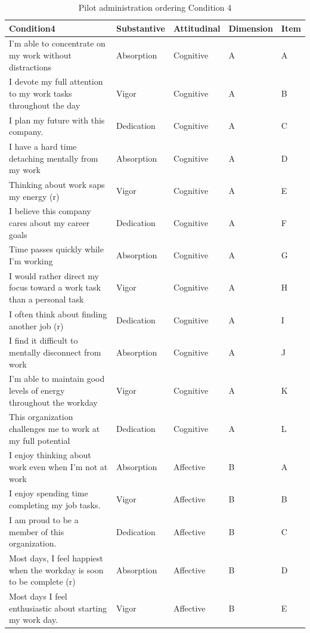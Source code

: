 \documentclass[
]{book}
\begin{document}
\begin{table}

\caption{\label{tab:conditions}Pilot administration ordering Condition 4}
\centering
\begin{tabular}[t]{l|l|l|l|l}
\hline
Condition4 & Substantive & Attitudinal & Dimension & Item\\
\hline
I’m able to concentrate on my work without distractions & Absorption & Cognitive & A & A\\
\hline
I devote my full attention to my work tasks throughout the day & Vigor & Cognitive & A & B\\
\hline
I plan my future with this company. & Dedication & Cognitive & A & C\\
\hline
I have a hard time detaching mentally from my work & Absorption & Cognitive & A & D\\
\hline
Thinking about work saps my energy (r) & Vigor & Cognitive & A & E\\
\hline
I believe this company cares about my career goals & Dedication & Cognitive & A & F\\
\hline
Time passes quickly while I’m working & Absorption & Cognitive & A & G\\
\hline
I would rather direct my focus toward a work task than a personal task & Vigor & Cognitive & A & H\\
\hline
I often think about finding another job (r) & Dedication & Cognitive & A & I\\
\hline
I find it difficult to mentally disconnect from work & Absorption & Cognitive & A & J\\
\hline
I’m able to maintain good levels of energy throughout the workday & Vigor & Cognitive & A & K\\
\hline
This organization challenges me to work at my full potential & Dedication & Cognitive & A & L\\
\hline
I enjoy thinking about work even when I’m not at work & Absorption & Affective & B & A\\
\hline
I enjoy spending time completing my job tasks. & Vigor & Affective & B & B\\
\hline
I am proud to be a member of this organization. & Dedication & Affective & B & C\\
\hline
Most days, I feel happiest when the workday is soon to be complete (r) & Absorption & Affective & B & D\\
\hline
Most days I feel enthusiastic about starting my work day. & Vigor & Affective & B & E\\

\end{tabular}
\end{table}
\end{document}

